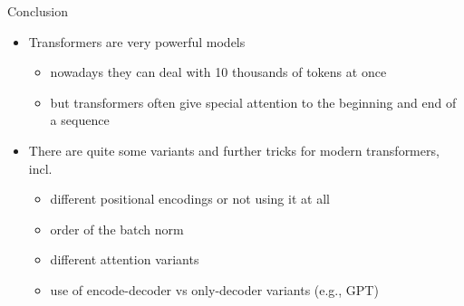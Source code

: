 \documentclass[aspectratio=169]{../latex_main/tntbeamer}  %
\begin{document}
        \begin{frame}{Conclusion}

            \begin{itemize}
                \item Transformers are very powerful models 
                \begin{itemize}
                    \item nowadays they can deal with 10 thousands of tokens at once
                    \item but transformers often give special attention to the beginning and end of a sequence
                \end{itemize}
                \item There are quite some variants and further tricks for modern transformers, incl.
                \begin{itemize}
                    \item different positional encodings or not using it at all
                    \item order of the batch norm
                    \item different attention variants
                    \item use of encode-decoder vs only-decoder variants (e.g., GPT)
                \end{itemize}
            \end{itemize}
        
        \end{frame}
 	
\end{document}
